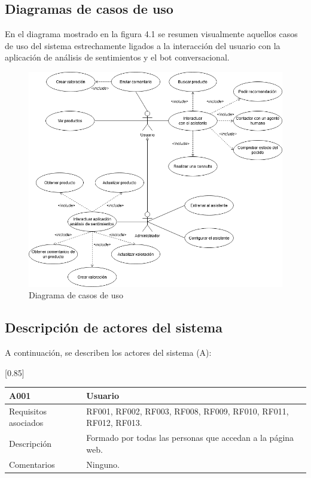 \subsection{Diagramas de casos de uso}


En el diagrama mostrado en la figura 4.1 se resumen visualmente aquellos casos de uso del sistema estrechamente ligados a la interacción del usuario con la aplicación de análisis de sentimientos y el bot conversacional.

\begin{figure}[ht]
	\begin{center}
		\includegraphics[width =\textwidth]{Figuras/DiagramaCasosUso.png}
	\end{center}
	\caption{\label{fig:casosUso} Diagrama de casos de uso}
\end{figure}

\newpage

\subsection{Descripción de actores del sistema}

A continuación, se describen los actores del sistema (A):

\begin{table}[htbp]
  \centering
    \scalebox{0.85}[0.85] {
    \begin{tabular}{l p{32.145em}}
    \toprule
    \textbf{A001} & \textbf{Usuario} \\
    \midrule
    Requisitos asociados & RF001, RF002, RF003, RF008, RF009, RF010, RF011, RF012, RF013. \\
    Descripción & Formado por todas las personas que accedan a la página web. \\
    Comentarios & Ninguno. \\
    \midrule
    \end{tabular}%
    }
  \label{tab:a003}
\end{table}%

